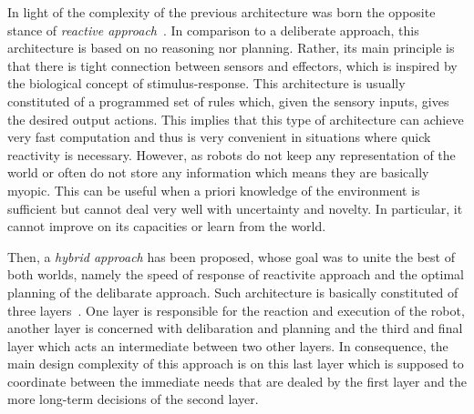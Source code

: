 
    In light of the complexity of the previous architecture was born the opposite stance of \emph{reactive approach}~\parencite{Brooks1986}. In comparison to a deliberate approach, this architecture is based on no reasoning nor planning. Rather, its main principle is that there is tight connection between sensors and effectors, which is inspired by the biological concept of stimulus-response. This architecture is usually constituted of a programmed set of rules which, given the sensory inputs, gives the desired output actions. This implies that this type of architecture can achieve very fast computation and thus is very convenient in situations where quick reactivity is necessary. However, as robots do not keep any representation of the world or often do not store any information which means they are basically myopic. This can be useful when a priori knowledge of the environment is sufficient but cannot deal very well with uncertainty and novelty. In particular, it cannot improve on its capacities or learn from the world.

    Then, a \emph{hybrid approach} has been proposed, whose goal was to unite the best of both worlds, namely the speed of response of reactivite approach and the optimal planning of the delibarate approach. Such architecture is basically constituted of three layers~\parencite{Mataric2008}. One layer is responsible for the reaction and execution of the robot, another layer is concerned with delibaration and planning and the third and final layer which acts an intermediate between two other layers. In consequence, the main design complexity of this approach is on this last layer which is supposed to coordinate between the immediate needs that are dealed by the first layer and the more long-term decisions of the second layer.

